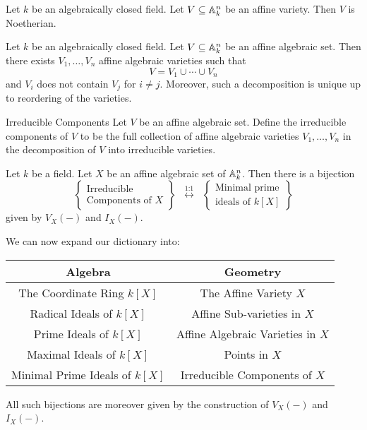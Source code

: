 \documentclass[a4paper]{article}
\begin{document}
\begin{prp}{}{} Let $k$ be an algebraically closed field. Let $V\subseteq\mathbb{A}_k^n$ be an affine variety. Then $V$ is Noetherian. 
\end{prp}

\begin{thm}{}{} Let $k$ be an algebraically closed field. Let $V\subseteq\mathbb{A}_k^n$ be an affine algebraic set. Then there exists $V_1,\dots,V_n$ affine algebraic varieties such that $$V=V_1\cup\cdots\cup V_n$$ and $V_i$ does not contain $V_j$ for $i\neq j$. Moreover, such a decomposition is unique up to reordering of the varieties. 
\end{thm}

\begin{defn}{Irreducible Components}{} Let $V$ be an affine algebraic set. Define the irreducible components of $V$ to be the full collection of affine algebraic varieties $V_1,\dots,V_n$ in the decomposition of $V$ into irreducible varieties. 
\end{defn}

\begin{lmm}{}{} Let $k$ be a field. Let $X$ be an affine algebraic set of $\mathbb{A}_k^n$. Then there is a bijection $$\left\{\substack{\text{Irreducible}\\\text{Components of } X}\right\}\;\;\overset{\text{1:1}}{\longleftrightarrow}\;\;\left\{\substack{\text{Minimal prime}\\\text{ideals of }k[X]}\right\}$$ given by $V_X(-)$ and $I_X(-)$. 
\end{lmm}

We can now expand our dictionary into: \\
\begin{center}\begin{tabular}{c|c}
Algebra & Geometry\\
\hline
The Coordinate Ring $k[X]$ & The Affine Variety $X$\\
Radical Ideals of $k[X]$ & Affine Sub-varieties in $X$\\
Prime Ideals of $k[X]$ & Affine Algebraic Varieties in $X$\\
Maximal Ideals of $k[X]$ & Points in $X$\\
Minimal Prime Ideals of $k[X]$ & Irreducible Components of $X$
\end{tabular}\end{center}

All such bijections are moreover given by the construction of $V_X(-)$ and $I_X(-)$. 
\end{document}
